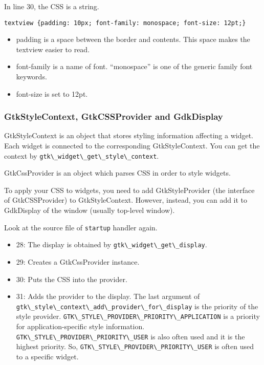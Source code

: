 In line 30, the CSS is a string.

\begin{lstlisting}
textview {padding: 10px; font-family: monospace; font-size: 12pt;}
\end{lstlisting}

\begin{itemize}
\tightlist
\item
  padding is a space between the border and contents. This space makes
  the textview easier to read.
\item
  font-family is a name of font. ``monospace'' is one of the generic
  family font keywords.
\item
  font-size is set to 12pt.
\end{itemize}

\hypertarget{gtkstylecontext-gtkcssprovider-and-gdkdisplay}{%
\subsubsection{GtkStyleContext, GtkCSSProvider and
GdkDisplay}\label{gtkstylecontext-gtkcssprovider-and-gdkdisplay}}

GtkStyleContext is an object that stores styling information affecting a
widget. Each widget is connected to the corresponding GtkStyleContext.
You can get the context by
\passthrough{\lstinline!gtk\_widget\_get\_style\_context!}.

GtkCssProvider is an object which parses CSS in order to style widgets.

To apply your CSS to widgets, you need to add GtkStyleProvider (the
interface of GtkCSSProvider) to GtkStyleContext. However, instead, you
can add it to GdkDisplay of the window (usually top-level window).

Look at the source file of \passthrough{\lstinline!startup!} handler
again.

\begin{itemize}
\tightlist
\item
  28: The display is obtained by
  \passthrough{\lstinline!gtk\_widget\_get\_display!}.
\item
  29: Creates a GtkCssProvider instance.
\item
  30: Puts the CSS into the provider.
\item
  31: Adds the provider to the display. The last argument of
  \passthrough{\lstinline!gtk\_style\_context\_add\_provider\_for\_display!}
  is the priority of the style provider.
  \passthrough{\lstinline!GTK\_STYLE\_PROVIDER\_PRIORITY\_APPLICATION!}
  is a priority for application-specific style information.
  \passthrough{\lstinline!GTK\_STYLE\_PROVIDER\_PRIORITY\_USER!} is also
  often used and it is the highest priority. So,
  \passthrough{\lstinline!GTK\_STYLE\_PROVIDER\_PRIORITY\_USER!} is
  often used to a specific widget.
\end{itemize}

